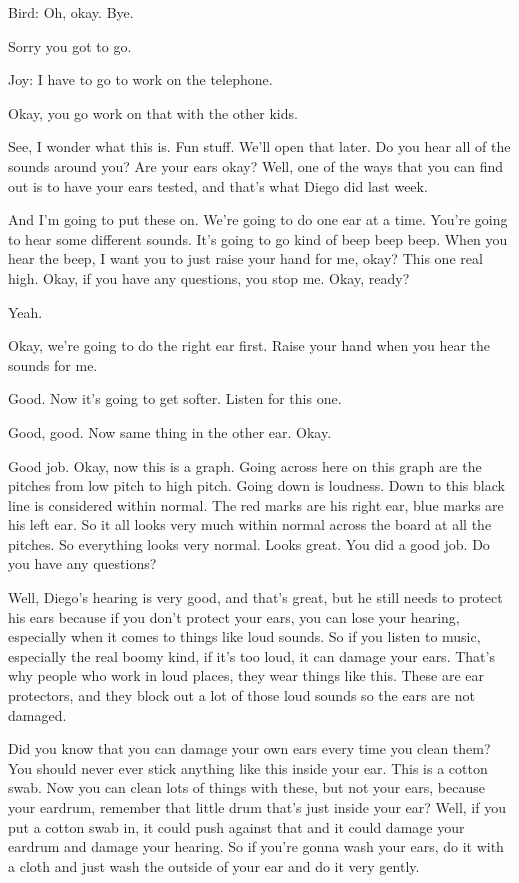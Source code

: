 Bird: Oh, okay. Bye.

Sorry you got to go.

Joy: I have to go to work on the telephone.

Okay, you go work on that with the other kids.

See, I wonder what this is. Fun stuff. We'll open that later. Do you hear all of the sounds around you? Are your ears okay? Well, one of the ways that you can find out is to have your ears tested, and that's what Diego did last week.

And I'm going to put these on. We're going to do one ear at a time. You're going to hear some different sounds. It's going to go kind of beep beep beep. When you hear the beep, I want you to just raise your hand for me, okay? This one real high. Okay, if you have any questions, you stop me. Okay, ready?

Yeah.

Okay, we're going to do the right ear first. Raise your hand when you hear the sounds for me.

Good. Now it's going to get softer. Listen for this one.

Good, good. Now same thing in the other ear. Okay.

Good job. Okay, now this is a graph. Going across here on this graph are the pitches from low pitch to high pitch. Going down is loudness. Down to this black line is considered within normal. The red marks are his right ear, blue marks are his left ear. So it all looks very much within normal across the board at all the pitches. So everything looks very normal. Looks great. You did a good job. Do you have any questions?

Well, Diego's hearing is very good, and that's great, but he still needs to protect his ears because if you don't protect your ears, you can lose your hearing, especially when it comes to things like loud sounds. So if you listen to music, especially the real boomy kind, if it's too loud, it can damage your ears. That's why people who work in loud places, they wear things like this. These are ear protectors, and they block out a lot of those loud sounds so the ears are not damaged.

Did you know that you can damage your own ears every time you clean them? You should never ever stick anything like this inside your ear. This is a cotton swab. Now you can clean lots of things with these, but not your ears, because your eardrum, remember that little drum that's just inside your ear? Well, if you put a cotton swab in, it could push against that and it could damage your eardrum and damage your hearing. So if you're gonna wash your ears, do it with a cloth and just wash the outside of your ear and do it very gently.

